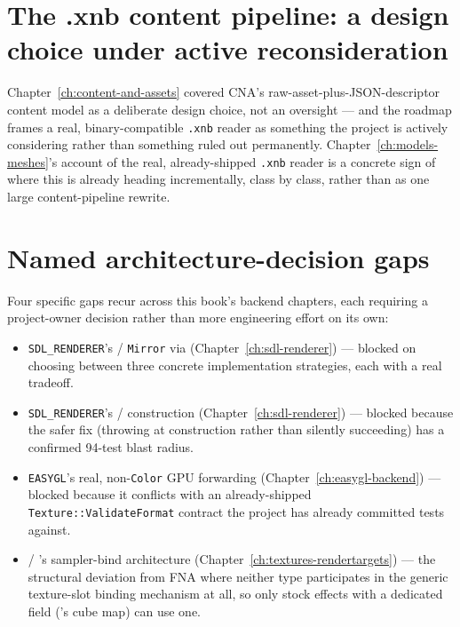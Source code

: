 \section{The .xnb content pipeline: a design choice under active reconsideration}

Chapter~\ref{ch:content-and-assets} covered CNA's raw-asset-plus-JSON-descriptor content
model as a deliberate design choice, not an oversight --- and the roadmap frames a real,
binary-compatible \texttt{.xnb} reader as something the project is actively considering
rather than something ruled out permanently. Chapter~\ref{ch:models-meshes}'s account of the
real, already-shipped \texttt{.xnb}  reader is a concrete sign of where this
is already heading incrementally, class by class, rather than as one large content-pipeline
rewrite.

\section{Named architecture-decision gaps}

Four specific gaps recur across this book's backend chapters, each requiring a project-owner
decision rather than more engineering effort on its own:

\begin{itemize}
  \item \texttt{SDL\_RENDERER}'s  / \texttt{Mirror} via
         (Chapter~\ref{ch:sdl-renderer}) --- blocked on choosing between
        three concrete implementation strategies, each with a real tradeoff.
  \item \texttt{SDL\_RENDERER}'s  /  construction
        (Chapter~\ref{ch:sdl-renderer}) --- blocked because the safer fix (throwing at
        construction rather than silently succeeding) has a confirmed 94-test blast radius.
  \item \texttt{EASYGL}'s real, non-\texttt{Color}  GPU forwarding
        (Chapter~\ref{ch:easygl-backend}) --- blocked because it conflicts with an
        already-shipped \texttt{Texture::ValidateFormat} contract the project has already
        committed tests against.
  \item {} / 's sampler-bind architecture
        (Chapter~\ref{ch:textures-rendertargets}) --- the structural deviation from FNA
        where neither type participates in the generic texture-slot binding mechanism at
        all, so only stock effects with a dedicated field ('s
        cube map) can use one.
\end{itemize}

